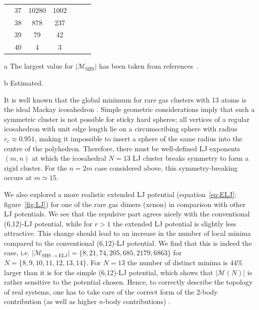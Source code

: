 \begin{table}
{\begin{threeparttable}
{\begin{tabular}{clccccc}
   & 37  & 10280  				& 1002 &                       &                       &                     \\
   & 38  & 878    				& 237  &                       &                       &                     \\
   & 39  & 79     				& 42   &                       &                       &                     \\
   & 40  & 4      				& 3    &                       &                       &                     \\\bottomrule
    \end{tabular}}
        \begin{tablenotes}
        \item[a]{The largest value for $|\mathcal{M}_\mathrm{SHS}|$ has been taken from 
    references~\cite{Holmes-Cerfon_EnumeratingRigidSphere_2016,Hoy_Structurefinitesphere_2012,Hoy_Structuredynamicsmodel_2015}.}
        \item[b]{Estimated.}
        \end{tablenotes}
    \end{threeparttable}}
\end{table}%


It is well known that the global minimum for rare gas clusters with 13 atoms is
the ideal Mackay icosahedron \autocite{Hoare_Physicalclustermechanics_1975,Hoare_Statisticalmechanicsmorphology_1976,Hoare_StructureDynamicsSimple_2007}. Simple
geometric considerations imply that such a symmetric cluster is not possible
for sticky hard spheres; all vertices of a regular icosahedron with unit edge length
lie on a circumscribing sphere with radius $r_c\approx 0.951$, making it
impossible to insert a sphere of the same radius into the centre of the
polyhedron.  Therefore, there must be well-defined LJ exponents $(m,n)$ at
which the icosahedral $N = 13$ LJ cluster breaks symmetry to form a rigid cluster.  
For the $n = 2m$ case considered above, this symmetry-breaking occurs at $m \simeq 15$.

We also explored a more realistic extended LJ potential (equation~\eqref{eq:ELJ}; figure~\ref{fig:LJ})
for one of the rare gas dimers (xenon) 
in comparison with other LJ potentials. We see that the repulsive part agrees
nicely with the conventional (6,12)-LJ potential, while for $r > 1$
the extended LJ potential is slightly less attractive. 
This change should lead to an increase in the number of local minima compared to the conventional
(6,12)-LJ potential. We find that this is indeed the case, i.e.
$|\mathcal{M}_\mathrm{SHS\to ELJ}|=\{8,21,74,205,685,2179,6863\}$ for
$N=\{8,9,10,11,12,13,14\}$.  For $N=13$ the number of distinct minima is 44\% larger than it is for the simple (6,12)-LJ potential,
which shows that $|\mathcal{M}(N)|$ is rather sensitive to the potential chosen.
Hence, to correctly describe the topology of real systems, one has to take care
of the correct form of the 2-body contribution (as well as higher $n$-body
contributions) \autocite{Schwerdtfeger-2016}.



